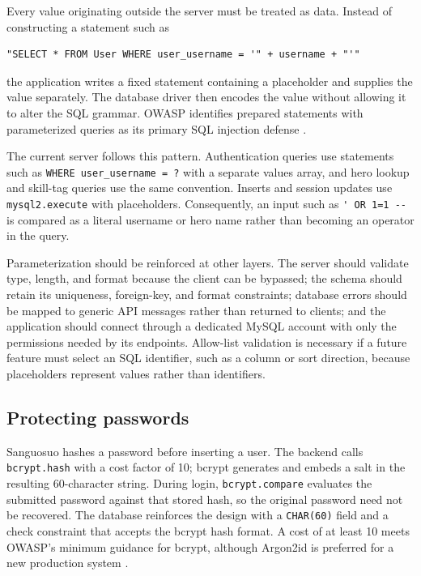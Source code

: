 Every value originating outside the server must be treated as data. Instead of constructing a statement such as
\begin{verbatim}
"SELECT * FROM User WHERE user_username = '" + username + "'"
\end{verbatim}
the application writes a fixed statement containing a placeholder and supplies the value separately. The database driver then encodes the value without allowing it to alter the SQL grammar. OWASP identifies prepared statements with parameterized queries as its primary SQL injection defense \cite{OWASPSQLi}.

The current server follows this pattern. Authentication queries use statements such as \verb|WHERE user_username = ?| with a separate values array, and hero lookup and skill-tag queries use the same convention. Inserts and session updates use \verb|mysql2.execute| with placeholders. Consequently, an input such as \verb|' OR 1=1 --| is compared as a literal username or hero name rather than becoming an operator in the query.

Parameterization should be reinforced at other layers. The server should validate type, length, and format because the client can be bypassed; the schema should retain its uniqueness, foreign-key, and format constraints; database errors should be mapped to generic API messages rather than returned to clients; and the application should connect through a dedicated MySQL account with only the permissions needed by its endpoints. Allow-list validation is necessary if a future feature must select an SQL identifier, such as a column or sort direction, because placeholders represent values rather than identifiers.

\subsection{Protecting passwords}

Sanguosuo hashes a password before inserting a user. The backend calls \verb|bcrypt.hash| with a cost factor of 10; bcrypt generates and embeds a salt in the resulting 60-character string. During login, \verb|bcrypt.compare| evaluates the submitted password against that stored hash, so the original password need not be recovered. The database reinforces the design with a \verb|CHAR(60)| field and a check constraint that accepts the bcrypt hash format. A cost of at least 10 meets OWASP's minimum guidance for bcrypt, although Argon2id is preferred for a new production system \cite{OWASPPassword}.

